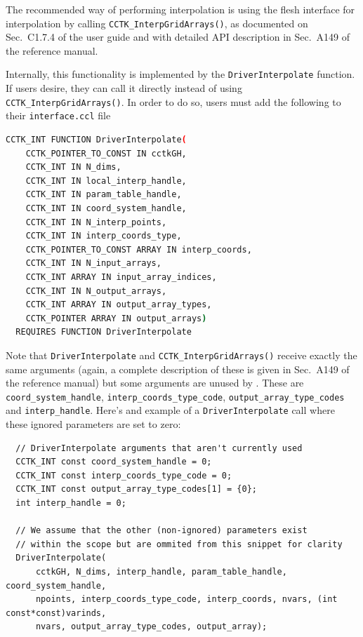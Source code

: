 The recommended way of performing interpolation is using the flesh interface for interpolation by calling \texttt{CCTK\_InterpGridArrays()}, as documented on Sec.~C1.7.4 of the \Cactus\space user guide and with detailed API description in Sec.~A149 of the \Cactus\space reference manual.

Internally, this functionality is implemented by the \texttt{DriverInterpolate} function. If users desire, they can call it directly instead of using \texttt{CCTK\_InterpGridArrays()}. In order to do so, users must add the following to their \texttt{interface.ccl} file
%
\begin{lstlisting}[language=bash]
  CCTK_INT FUNCTION DriverInterpolate(
    CCTK_POINTER_TO_CONST IN cctkGH,
    CCTK_INT IN N_dims,
    CCTK_INT IN local_interp_handle,
    CCTK_INT IN param_table_handle,
    CCTK_INT IN coord_system_handle,
    CCTK_INT IN N_interp_points,
    CCTK_INT IN interp_coords_type,
    CCTK_POINTER_TO_CONST ARRAY IN interp_coords,
    CCTK_INT IN N_input_arrays,
    CCTK_INT ARRAY IN input_array_indices,
    CCTK_INT IN N_output_arrays,
    CCTK_INT ARRAY IN output_array_types,
    CCTK_POINTER ARRAY IN output_arrays)
  REQUIRES FUNCTION DriverInterpolate
\end{lstlisting}

Note that \texttt{DriverInterpolate} and \texttt{CCTK\_InterpGridArrays()} receive exactly the same arguments (again, a complete description of these is given in Sec.~A149 of the \Cactus\space reference manual) but some arguments are unused by \CarpetX. These are \texttt{coord\_system\_handle}, \texttt{interp\_coords\_type\_code}, \texttt{output\_array\_type\_codes} and \texttt{interp\_handle}. Here's and example of a \texttt{DriverInterpolate} call where these ignored parameters are set to zero:

\begin{lstlisting}
  // DriverInterpolate arguments that aren't currently used
  CCTK_INT const coord_system_handle = 0;
  CCTK_INT const interp_coords_type_code = 0;
  CCTK_INT const output_array_type_codes[1] = {0};
  int interp_handle = 0;

  // We assume that the other (non-ignored) parameters exist
  // within the scope but are ommited from this snippet for clarity
  DriverInterpolate(
      cctkGH, N_dims, interp_handle, param_table_handle, coord_system_handle,
      npoints, interp_coords_type_code, interp_coords, nvars, (int const*const)varinds,
      nvars, output_array_type_codes, output_array);
\end{lstlisting}


